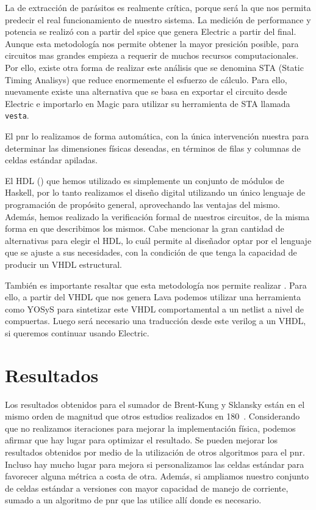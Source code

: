 La de extracción de parásitos es realmente crítica, porque será la que nos permita predecir el real funcionamiento de nuestro sistema. La medición de performance y potencia se realizó con  a partir del  spice que genera Electric a partir del  final. Aunque esta metodología nos permite obtener la mayor presición posible, para circuitos mas grandes empieza a requerir de muchos recursos computacionales. Por ello, existe otra forma de realizar este análisis que se denomina  STA (Static Timing Analisys) que reduce enormemente el esfuerzo de cálculo. Para ello, nuevamente existe una alternativa que se basa en exportar el circuito desde Electric e importarlo en Magic para utilizar su herramienta de STA llamada \verb.vesta..

El \gls{pnr} lo realizamos de forma automática, con la única intervención nuestra para determinar las dimensiones físicas deseadas, en términos de filas y columnas de celdas estándar apiladas.

El HDL () que hemos utilizado es simplemente un conjunto de módulos de Haskell, por lo tanto realizamos el diseño digital utilizando un único lenguaje de programación de propósito general, aprovechando las ventajas del mismo. Además, hemos realizado la verificación formal de nuestros circuitos, de la misma forma en que describimos los mismos. Cabe mencionar la gran cantidad de alternativas para elegir el HDL, lo cuál permite al diseñador optar por el lenguaje que se ajuste a sus necesidades, con la condición de que tenga la capacidad de producir un  VHDL estructural.


También es importante resaltar que esta metodología nos permite realizar . Para ello, a partir del VHDL que nos genera Lava podemos utilizar una herramienta como YOSyS\cite{Yosys} para sintetizar este VHDL comportamental a un netlist a nivel de compuertas. Luego será necesario una traducción desde este \netlist  verilog a un  VHDL, si queremos continuar usando Electric. 


\section{Resultados}
Los resultados obtenidos para el sumador de Brent-Kung y Sklansky están en el mismo orden de magnitud que otros estudios\cite{ramanathan,Chatterjee} realizados en 180~\nanom. Considerando que no realizamos iteraciones para mejorar la implementación física, podemos afirmar que hay lugar para optimizar el resultado. Se pueden mejorar los resultados obtenidos por medio de la utilización de otros algoritmos para el \gls{pnr}. Incluso hay mucho lugar para mejora si personalizamos las celdas estándar para favorecer alguna métrica a costa de otra. Además, si ampliamos nuestro conjunto de celdas estándar a versiones con mayor capacidad de manejo de corriente, sumado a un algoritmo de \gls{pnr} que las utilice allí donde es necesario.

